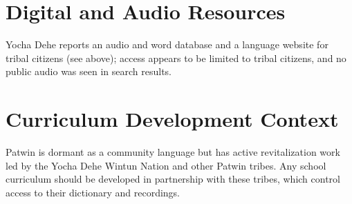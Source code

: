 \documentclass[12pt]{article}
\begin{document}
\section{Digital and Audio Resources}
Yocha Dehe reports an audio and word database and a language website for tribal citizens (see above); access appears to be limited to tribal citizens, and no public audio was seen in search results.

\section{Curriculum Development Context}
Patwin is dormant as a community language but has active revitalization work led by the Yocha Dehe Wintun Nation and other Patwin tribes. Any school curriculum should be developed in partnership with these tribes, which control access to their dictionary and recordings.
\end{document}
